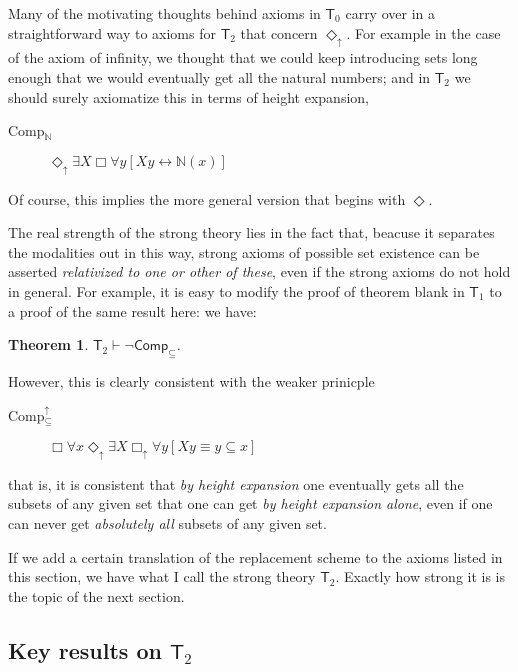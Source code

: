 \documentclass{article}
\newcommand{\du}{\Diamond_\uparrow}
\newcommand{\bu}{\Box_\uparrow}
\newtheorem{theorem}{Theorem}
\begin{document}
Many of the motivating thoughts behind axioms in $\mathsf{T}_0$
carry over in a straightforward way to axioms for $\mathsf{T}_2$ that concern $\du$.
For example in the case of the axiom of infinity, we thought that we could keep introducing 
sets long enough that we would eventually get all the natural numbers; and in $\mathsf{T}_2$ we 
should surely axiomatize this in terms of height expansion,

\begin{description}
    \item[Comp$_\mathbb{N}$]
    $\du \exists X \Box \forall y[ Xy \leftrightarrow \mathbb{N}(x)]$
\end{description}
Of course, this implies the more general version that begins with $\Diamond$.

The real strength of the strong theory 
lies in the fact that, beacuse it separates the modalities out in this way, 
strong axioms of possible set existence can be asserted \emph{relativized to one 
or other of these}, even if the strong axioms do not hold in general. For example, 
it is easy to modify the proof of theorem blank in $\mathsf{T}_1$ to a proof of the same result here:
we have:
\begin{theorem}
    $\mathsf{T}_2 \vdash \neg \mathsf{Comp}_\subseteq$.
\end{theorem}
However, this is clearly consistent with the weaker prinicple
\begin{description}
    \item[Comp$_\subseteq^\uparrow$] $\Box \forall x \du \exists X \bu \forall y[Xy \equiv y \subseteq x]$
\end{description}
that is, it is consistent that \emph{by height expansion} one eventually gets all the subsets 
of any given set that one can get \emph{by height expansion alone}, even if one can never get 
\emph{absolutely all} subsets of any given set.

If we add a certain translation of the replacement scheme to the axioms listed in this section, 
we have what I call the strong theory $\mathsf{T}_2$. Exactly how strong it is is the topic 
of the next section.

\subsection{Key results on $\mathsf{T}_2$}
\end{document}
